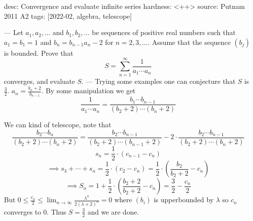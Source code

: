 desc: Convergence and evaluate infinite series
hardness: <++>
source: Putnam 2011 A2
tags: [2022-02, algebra, telescope]

---
Let $a_1,a_2,\dots$ and $b_1,b_2,\dots$ be sequences of positive real numbers such that $a_1=b_1=1$ and $b_n=b_{n-1}a_n-2$ for $n=2,3,\dots.$ Assume that the sequence $(b_j)$ is bounded. Prove that
\[ S=\sum_{n=1}^{\infty}\frac1{a_1\cdots a_n} \]
converges, and evaluate $S.$
---
Trying some examples one can conjecture that $S$ is $\frac32$.
$a_n = \frac{b_n + 2}{b_{n-1}}$. By some manipulation we get
\[\frac1{a_1\cdots a_n} = \frac{b_1 \cdots b_{n-1}}{(b_2+2) \cdots (b_{n}+2)}\]

We can kind of telescope, note that
\[
  \frac{b_2 \cdots b_n}{(b_2+2)\cdots(b_n +2)}
  = \frac{b_2 \cdots b_{n-1}}{(b_2 + 2) \cdots (b_{n-1}+2)}
  -2\cdot\frac{b_2 \cdots b_{n-1}}{(b_2 + 2) \cdots (b_n + 2)}
\]
\[
  s_n = \frac12 \cdot \left(c_{n-1} - c_n\right)
\]
\[
  \implies s_3 + \cdots + s_n = \frac12 \cdot \left( c_2 - c_n\right) 
  = \frac12 \cdot \left( \frac{b_2}{b_2 + 2} - c_n\right)
\]
\[
  \implies S_n = 1 + \frac12 \cdot \left(\frac{b_2 + 2}{b_2 + 2} - c_n\right) = \frac32 - \frac{c_n}2
\]
But $0 \leq \frac{c_n}2 \leq \displaystyle\lim_{n \to \infty}\frac{\lambda ^n}{2(\lambda +2)^n} = 0$ where $(b_i)$ is upperbounded by $\lambda$
so $c_n$ converges to $0$. Thus $S = \frac32$ and we are done.
